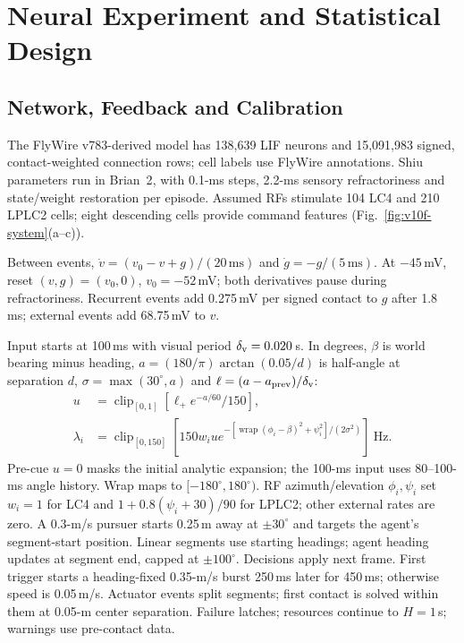 \section{Neural Experiment and Statistical Design}
\subsection{Network, Feedback and Calibration}
The FlyWire v783-derived model\cite{dorkenwald2024neuronal} has 138,639 LIF neurons and 15,091,983 signed, contact-weighted connection rows; cell labels use FlyWire annotations\cite{schlegel2024annotation}. Shiu parameters\cite{shiu2024drosophila} run in Brian~2\cite{stimberg2019brian2}, with 0.1-ms steps, 2.2-ms sensory refractoriness and state/weight restoration per episode. Assumed RFs stimulate 104 LC4 and 210 LPLC2 cells; eight descending cells provide command features (Fig.~\ref{fig:v10f-system}(a--c)).

Between events, $\dot v=(v_0-v+g)/(20\,\mathrm{ms})$ and $\dot g=-g/(5\,\mathrm{ms})$. At $-45$\,mV, reset $(v,g)=(v_0,0)$, $v_0=-52$\,mV; both derivatives pause during refractoriness. Recurrent events add 0.275\,mV per signed contact to $g$ after 1.8\,ms; external events add 68.75\,mV to $v$.

Input starts at 100\,ms with visual period $\delta_{\rm v}=0.020$\,s. In degrees, $\beta$ is world bearing minus heading, $a=(180/\pi)\arctan(0.05/d)$ is half-angle at separation $d$, $\sigma=\max(30^\circ,a)$ and $\ell=(a-a_{\rm prev})/\delta_{\rm v}$:
\begin{equation}
\begin{aligned}
u&=\operatorname{clip}_{[0,1]}[\ell_+e^{-a/60}/150],\\
\lambda_i&=\operatorname{clip}_{[0,150]}[150w_i u e^{-[\operatorname{wrap}(\phi_i-\beta)^2+\psi_i^2]/(2\sigma^2)}]\ \mathrm{Hz}.
\end{aligned}
\end{equation}
Pre-cue $u=0$ masks the initial analytic expansion; the 100-ms input uses 80--100-ms angle history. Wrap maps to $[-180^\circ,180^\circ)$. RF azimuth/elevation $\phi_i,\psi_i$ set $w_i=1$ for LC4 and $1+0.8(\psi_i+30)/90$ for LPLC2; other external rates are zero. A 0.3-m/s pursuer starts 0.25\,m away at $\pm30^\circ$ and targets the agent's segment-start position. Linear segments use starting headings; agent heading updates at segment end, capped at $\pm100^\circ$. Decisions apply next frame. First trigger starts a heading-fixed 0.35-m/s burst 250\,ms later for 450\,ms; otherwise speed is 0.05\,m/s. Actuator events split segments; first contact is solved within them at 0.05-m center separation. Failure latches; resources continue to $H=1$\,s; warnings use pre-contact data.


